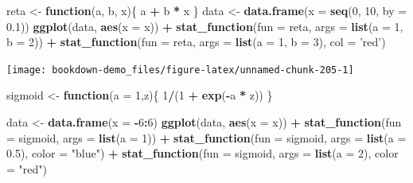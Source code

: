 \documentclass[]{book}
\newenvironment{Shaded}{\begin{snugshade}}{\end{snugshade}}
\newcommand{\KeywordTok}[1]{\textcolor[rgb]{0.13,0.29,0.53}{\textbf{#1}}}
\newcommand{\DataTypeTok}[1]{\textcolor[rgb]{0.13,0.29,0.53}{#1}}
\newcommand{\DecValTok}[1]{\textcolor[rgb]{0.00,0.00,0.81}{#1}}
\newcommand{\FloatTok}[1]{\textcolor[rgb]{0.00,0.00,0.81}{#1}}
\newcommand{\StringTok}[1]{\textcolor[rgb]{0.31,0.60,0.02}{#1}}
\newcommand{\ControlFlowTok}[1]{\textcolor[rgb]{0.13,0.29,0.53}{\textbf{#1}}}
\newcommand{\OperatorTok}[1]{\textcolor[rgb]{0.81,0.36,0.00}{\textbf{#1}}}
\newcommand{\NormalTok}[1]{#1}
\begin{document}
\begin{Shaded}
\begin{Highlighting}[]
\NormalTok{reta <-}\StringTok{ }\ControlFlowTok{function}\NormalTok{(a, b, x)\{}
\NormalTok{  a }\OperatorTok{+}\StringTok{ }\NormalTok{b }\OperatorTok{*}\StringTok{ }\NormalTok{x}
\NormalTok{\}}
\NormalTok{data <-}\StringTok{ }\KeywordTok{data.frame}\NormalTok{(}\DataTypeTok{x =} \KeywordTok{seq}\NormalTok{(}\DecValTok{0}\NormalTok{, }\DecValTok{10}\NormalTok{, }\DataTypeTok{by =} \FloatTok{0.1}\NormalTok{))}
\KeywordTok{ggplot}\NormalTok{(data, }\KeywordTok{aes}\NormalTok{(}\DataTypeTok{x =}\NormalTok{ x)) }\OperatorTok{+}
\StringTok{  }\KeywordTok{stat_function}\NormalTok{(}\DataTypeTok{fun =}\NormalTok{ reta, }\DataTypeTok{args =} \KeywordTok{list}\NormalTok{(}\DataTypeTok{a =} \DecValTok{1}\NormalTok{, }\DataTypeTok{b =} \DecValTok{2}\NormalTok{)) }\OperatorTok{+}
\StringTok{  }\KeywordTok{stat_function}\NormalTok{(}\DataTypeTok{fun =}\NormalTok{ reta, }\DataTypeTok{args =} \KeywordTok{list}\NormalTok{(}\DataTypeTok{a =} \DecValTok{1}\NormalTok{, }\DataTypeTok{b =} \DecValTok{3}\NormalTok{), }\DataTypeTok{col =} \StringTok{'red'}\NormalTok{)}
\end{Highlighting}
\end{Shaded}

\begin{center}\texttt{[image: bookdown-demo\_files/figure-latex/unnamed-chunk-205-1]} \end{center}

\begin{Shaded}
\begin{Highlighting}[]
\NormalTok{sigmoid <-}\StringTok{ }\ControlFlowTok{function}\NormalTok{(}\DataTypeTok{a =} \DecValTok{1}\NormalTok{,z)\{}
  \DecValTok{1}\OperatorTok{/}\NormalTok{(}\DecValTok{1} \OperatorTok{+}\StringTok{ }\KeywordTok{exp}\NormalTok{(}\OperatorTok{-}\NormalTok{a }\OperatorTok{*}\StringTok{ }\NormalTok{z))}
\NormalTok{\}}

\NormalTok{data <-}\StringTok{ }\KeywordTok{data.frame}\NormalTok{(}\DataTypeTok{x =} \OperatorTok{-}\DecValTok{6}\OperatorTok{:}\DecValTok{6}\NormalTok{)}
\KeywordTok{ggplot}\NormalTok{(data, }\KeywordTok{aes}\NormalTok{(}\DataTypeTok{x =}\NormalTok{ x)) }\OperatorTok{+}
\StringTok{  }\KeywordTok{stat_function}\NormalTok{(}\DataTypeTok{fun =}\NormalTok{ sigmoid, }\DataTypeTok{args =} \KeywordTok{list}\NormalTok{(}\DataTypeTok{a =} \DecValTok{1}\NormalTok{)) }\OperatorTok{+}
\StringTok{  }\KeywordTok{stat_function}\NormalTok{(}\DataTypeTok{fun =}\NormalTok{ sigmoid, }\DataTypeTok{args =} \KeywordTok{list}\NormalTok{(}\DataTypeTok{a =} \FloatTok{0.5}\NormalTok{), }\DataTypeTok{color =} \StringTok{"blue"}\NormalTok{) }\OperatorTok{+}
\StringTok{  }\KeywordTok{stat_function}\NormalTok{(}\DataTypeTok{fun =}\NormalTok{ sigmoid, }\DataTypeTok{args =} \KeywordTok{list}\NormalTok{(}\DataTypeTok{a =} \DecValTok{2}\NormalTok{), }\DataTypeTok{color =} \StringTok{"red"}\NormalTok{) }
\end{Highlighting}
\end{Shaded}
\end{document}

